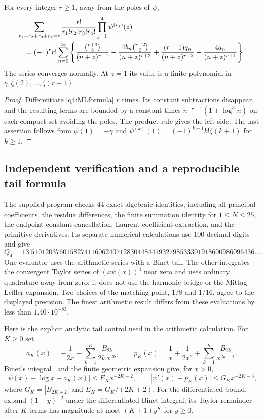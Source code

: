 \begin{corollary}\label{q4:derivatives}
For every integer $r\geq1$, away from the poles of $\psi$,
\begin{align}\label{q4:allpolygamma}
 &\sum_{r_1+r_2+r_3+r_4=r}
       \frac{r!}{r_1!r_2!r_3!r_4!}
       \prod_{j=1}^4\psi^{(r_j)}(z)\notag\\
 &\quad=(-1)^rr!\sum_{n=0}^{\infty}
       \left\{\frac{\binom{r+3}{3}}{(n+z)^{r+4}}
       -\frac{4b_n\binom{r+2}{2}}{(n+z)^{r+3}}
       +\frac{(r+1)q_n}{(n+z)^{r+2}}
       +\frac{4a_n}{(n+z)^{r+1}}\right\}.
\end{align}
The series converges normally.  At $z=1$ its value is a finite polynomial
in $\gamma,\zeta(2),\ldots,\zeta(r+1)$.
\end{corollary}
\begin{proof}
Differentiate \eqref{q4:MLformula} $r$ times.  Its constant subtractions
disappear, and the resulting terms are bounded by a constant times
$n^{-r-1}(1+\log^3n)$ on each compact set avoiding the poles.
The product rule gives the left side.  The last assertion follows from
$\psi(1)=-\gamma$ and
$\psi^{(k)}(1)=(-1)^{k+1}k!\zeta(k+1)$ for $k\geq1$.
\end{proof}

\subsection{Independent verification and a reproducible tail formula}

The supplied program checks 44 exact algebraic identities, including
all principal coefficients, the residue differences, the finite
summation identity for $1\leq N\leq25$, the endpoint-constant
cancellation, Laurent coefficient extraction, and the primitive
derivatives.  Its separate numerical calculations use 100 decimal
digits and give
\[
 Q_4=13.510120376015827411606240712830448441932798533301918600986096436\ldots.
\]
One evaluator uses the arithmetic series with a Binet tail.  The other
integrates the convergent Taylor series of $(x\psi(x))^4$ near zero and
uses ordinary quadrature away from zero; it does not use the harmonic
bridge or the Mittag--Leffler expansion.  Two choices of the matching
point, $1/8$ and $1/16$, agree to the displayed precision.  The finest
arithmetic result differs from these evaluations by less than
$1.40\cdot10^{-83}$.

Here is the explicit analytic tail control used in the arithmetic
calculation.  For $K\geq0$ set
\[
 a_K(x)=-\frac1{2x}-\sum_{k=1}^K\frac{B_{2k}}{2k\,x^{2k}},
 \qquad
 p_K(x)=\frac1x+\frac1{2x^2}
                      +\sum_{k=1}^K\frac{B_{2k}}{x^{2k+1}}.
\]
Binet's integral~\cite[Equation~5.9.15]{DLMF} and the finite
geometric expansion give, for $x>0$,
\[
 |\psi(x)-\log x-a_K(x)|\leq E_Kx^{-2K-2},\qquad
 |\psi'(x)-p_K(x)|\leq G_Kx^{-2K-3},
\]
where $G_K=|B_{2K+2}|$ and $E_K=G_K/(2K+2)$.
For the differentiated bound, expand $(1+y)^{-2}$ under the differentiated
Binet integral; its Taylor remainder after $K$ terms has magnitude at
most $(K+1)y^K$ for $y\geq0$.

